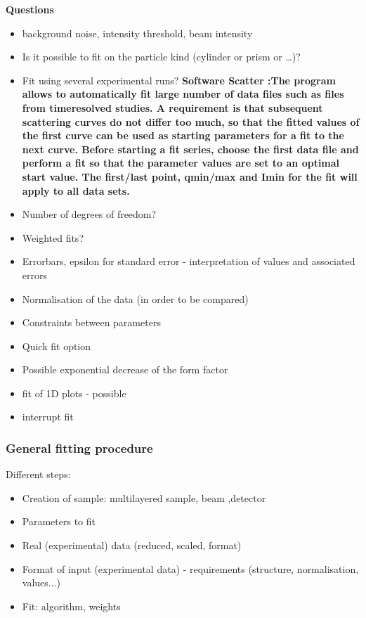 \textbf{Questions}
\begin{itemize}
\item background noise, intensity threshold, beam intensity 
\item Is it possible to fit on the particle kind (cylinder or prism or
\ldots)?
\item Fit using several experimental runs?
\textbf{ Software Scatter :The program allows to automatically fit large number of data files such as files from timeresolved
studies. A requirement is that subsequent scattering curves do not differ too much, so
that the fitted values of the first curve can be used as starting parameters for a fit to the next
curve. Before starting a fit series, choose the first data file and perform a fit so that the
parameter values are set to an optimal start value. The first/last point, qmin/max and Imin for
the fit will apply to all data sets.}
\item Number of degrees of freedom?
\item Weighted fits?
\item Errorbars, epsilon for standard error - interpretation of values
  and associated errors
\item Normalisation of the data (in order to be compared)
\item Constraints between parameters
\item Quick fit option
\item Possible exponential decrease of the form factor
\item fit of 1D plots - possible
\item interrupt fit
\end{itemize}

\subsubsection{General fitting procedure}

Different steps:
\begin{itemize}
\item Creation of sample: multilayered sample, beam ,detector
\item Parameters to fit
\item Real (experimental) data (reduced, scaled, format)
\item Format of input (experimental data) - requirements (structure,
normalisation, values...)
\item Fit: algorithm, weights
\end{itemize}


